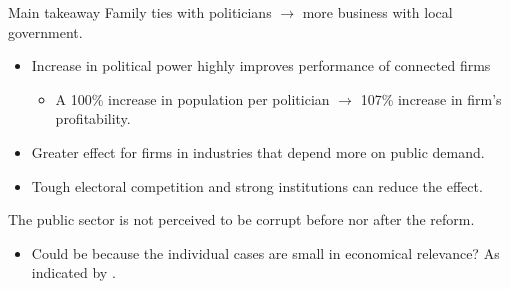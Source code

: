 \documentclass[8pt]{beamer}
\begin{document}
\begin{frame}{Main takeaway}
  Family ties with politicians $\rightarrow$ more business with local government.
  \begin{itemize}
    \item Increase in political power highly improves performance of connected firms
    \begin{itemize}
      \normalsize
      \item A 100\% increase in population per politician $\rightarrow$ 107\% increase in firm's profitability.
    \end{itemize}
    \item Greater effect for firms in industries that depend more on public demand.
    \item Tough electoral competition and strong institutions can reduce the effect.
  \end{itemize}
  The public sector is not perceived to be corrupt before nor after the reform.
  \begin{itemize}
    \item Could be because the individual cases are small in economical relevance? As indicated by \citet{pena2018privatization}.
  \end{itemize}
\end{frame}




\begin{frame}%
  \printbibliography
\end{frame}

\end{document}
